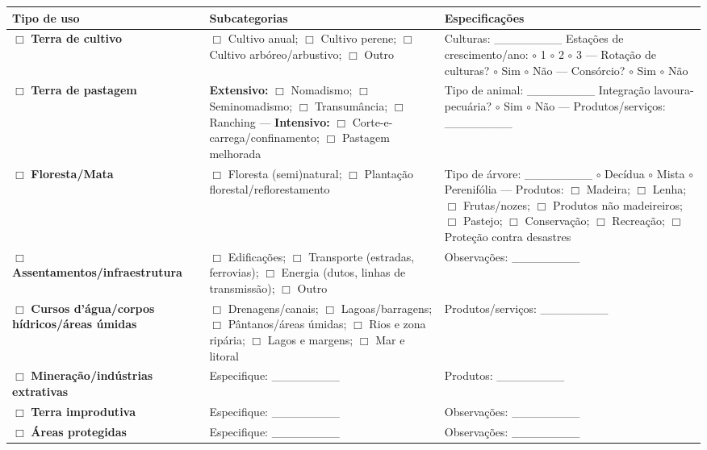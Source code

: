 {
\begin{longtable}[]{@{}
  >{\raggedright\arraybackslash}p{}
  >{\raggedright\arraybackslash}p{}
  >{\raggedright\arraybackslash}p{}@{}}
\toprule\noalign{}
\begin{minipage}[b]{\linewidth}\raggedright
Tipo de uso
\end{minipage} & \begin{minipage}[b]{\linewidth}\raggedright
Subcategorias
\end{minipage} & \begin{minipage}[b]{\linewidth}\raggedright
Especificações
\end{minipage} \\
\midrule\noalign{}
\endhead
\bottomrule\noalign{}
\endlastfoot
$\Box$ \textbf{Terra de cultivo} & $\Box$ Cultivo anual; $\Box$ Cultivo perene; $\Box$ Cultivo arbóreo/arbustivo; $\Box$ Outro & Culturas: \_\_\_\_\_\_\_\_ Estações de crescimento/ano: $\circ$ 1 $\circ$ 2 $\circ$ 3 --- Rotação de culturas? $\circ$ Sim $\circ$ Não --- Consórcio? $\circ$ Sim $\circ$ Não \\
$\Box$ \textbf{Terra de pastagem} & \textbf{Extensivo:} $\Box$ Nomadismo; $\Box$ Seminomadismo; $\Box$ Transumância; $\Box$ Ranching --- \textbf{Intensivo:} $\Box$ Corte-e-carrega/confinamento; $\Box$ Pastagem melhorada & Tipo de animal: \_\_\_\_\_\_\_\_ Integração lavoura-pecuária? $\circ$ Sim $\circ$ Não --- Produtos/serviços: \_\_\_\_\_\_\_\_ \\
$\Box$ \textbf{Floresta/Mata} & $\Box$ Floresta (semi)natural; $\Box$ Plantação florestal/reflorestamento & Tipo de árvore: \_\_\_\_\_\_\_\_ $\circ$ Decídua $\circ$ Mista $\circ$ Perenifólia --- Produtos: $\Box$ Madeira; $\Box$ Lenha; $\Box$ Frutas/nozes; $\Box$ Produtos não madeireiros; $\Box$ Pastejo; $\Box$ Conservação; $\Box$ Recreação; $\Box$ Proteção contra desastres \\
$\Box$ \textbf{Assentamentos/infraestrutura} & $\Box$ Edificações; $\Box$ Transporte (estradas, ferrovias); $\Box$ Energia (dutos, linhas de transmissão); $\Box$ Outro & Observações: \_\_\_\_\_\_\_\_ \\
$\Box$ \textbf{Cursos d'água/corpos hídricos/áreas úmidas} & $\Box$ Drenagens/canais; $\Box$ Lagoas/barragens; $\Box$ Pântanos/áreas úmidas; $\Box$ Rios e zona ripária; $\Box$ Lagos e margens; $\Box$ Mar e litoral & Produtos/serviços: \_\_\_\_\_\_\_\_ \\
$\Box$ \textbf{Mineração/indústrias extrativas} & Especifique: \_\_\_\_\_\_\_\_ & Produtos: \_\_\_\_\_\_\_\_ \\
$\Box$ \textbf{Terra improdutiva} & Especifique: \_\_\_\_\_\_\_\_ & Observações: \_\_\_\_\_\_\_\_ \\
$\Box$ \textbf{Áreas protegidas} & Especifique: \_\_\_\_\_\_\_\_ & Observações: \_\_\_\_\_\_\_\_ \\
\end{longtable}
}

